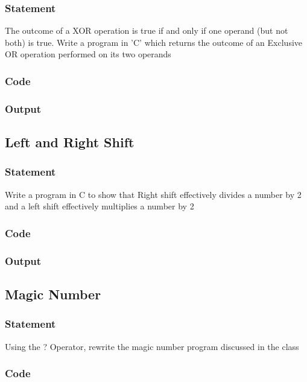 \subsubsection{Statement}
The outcome of a XOR operation is true if and only if one operand (but not both) is true. Write
a program in 'C' which returns the outcome of an Exclusive OR operation performed on its two
operands

\subsubsection{Code}

\subsubsection{Output}

\pagebreak
\subsection{Left and Right Shift}

\subsubsection{Statement}
Write a program in C to show that Right shift effectively divides a number by 2 and a left shift
effectively multiplies a number by 2

\subsubsection{Code}

\subsubsection{Output}

\pagebreak
\subsection{Magic Number}

\subsubsection{Statement}
Using the ? Operator, rewrite the magic number program discussed in the class

\subsubsection{Code}

